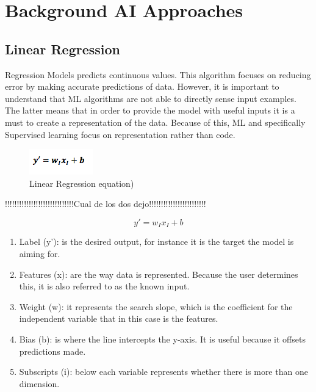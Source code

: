 

\section{Background \acl{AI} Approaches}
\label{sec:related}

\subsection{Linear Regression}

Regression Models predicts continuous values. This algorithm focuses on reducing error by making accurate predictions of data. However, it is important to understand that \ac{ML} algorithms are not able to directly sense input examples. The latter means that in order to provide the model with useful inputs it is a must to create a representation of the data. Because of this, \ac{ML} and specifically Supervised learning focus on representation rather than code. 

\begin{figure}[htbp]
  \centering
  \includegraphics[width=\textwidth]{images/regresion}
  \caption{Linear Regression equation)}
  \label{fig:regresion}
\end{figure}

!!!!!!!!!!!!!!!!!!!!!!!!!!!!!Cual de los dos dejo!!!!!!!!!!!!!!!!!!!!!!!!

\begin{equation} \label{eq:linearReg}
y'=w_I x_I+b
\end{equation}

\begin{enumerate}
 \item Label (y’): is the desired output, for instance it is the target the model is aiming for.
 \item Features (x):  are the way data is represented. Because the user determines this, it is also referred to as the known input.  
 \item Weight (w):  it represents the search slope, which is the coefficient for the independent variable that in this case is the features.  
 \item Bias (b): is where the line intercepts the y-axis. It is useful because it offsets predictions made. 
 \item Subscripts (i): below each variable represents whether there is more than one dimension.
\end{enumerate}


